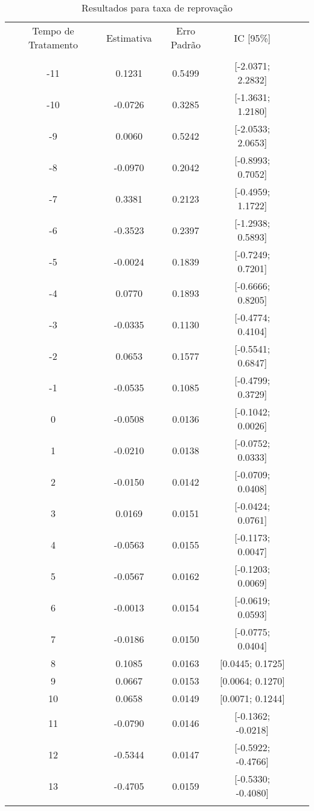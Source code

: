 \documentclass[
        12pt,                           %
        openright,                      %
        oneside,
        a4paper,                        %
        chapter=TITLE,         %
        section=TITLE,         %
        subsection=Title,      %
        english,                        %
        spanish,                        %
        portugues,                      %
        ]{abntex2}
\begin{document}
{\begin{apendicesenv}
\begin{table}[htbp]
\caption{Resultados para taxa de reprovação}
\centering
\begin{tabular}{cccccc}
\\ \hline
Tempo de Tratamento & Estimativa & Erro Padrão & IC [95\%] \\
\\ \hline
-11 & 0.1231 & 0.5499 & [-2.0371; 2.2832] \\
-10 & -0.0726 & 0.3285 & [-1.3631; 1.2180] \\
-9 & 0.0060 & 0.5242 & [-2.0533; 2.0653] \\
-8 & -0.0970 & 0.2042 & [-0.8993; 0.7052] \\
-7 & 0.3381 & 0.2123 & [-0.4959; 1.1722] \\
-6 & -0.3523 & 0.2397 & [-1.2938; 0.5893] \\
-5 & -0.0024 & 0.1839 & [-0.7249; 0.7201] \\
-4 & 0.0770 & 0.1893 & [-0.6666; 0.8205] \\
-3 & -0.0335 & 0.1130 & [-0.4774; 0.4104] \\
-2 & 0.0653 & 0.1577 & [-0.5541; 0.6847] \\
-1 & -0.0535 & 0.1085 & [-0.4799; 0.3729] \\
0 & -0.0508 & 0.0136 & [-0.1042; 0.0026] \\
1 & -0.0210 & 0.0138 & [-0.0752; 0.0333] \\
2 & -0.0150 & 0.0142 & [-0.0709; 0.0408] \\
3 & 0.0169 & 0.0151 & [-0.0424; 0.0761] \\
4 & -0.0563 & 0.0155 & [-0.1173; 0.0047] \\
5 & -0.0567 & 0.0162 & [-0.1203; 0.0069] \\
6 & -0.0013 & 0.0154 & [-0.0619; 0.0593] \\
7 & -0.0186 & 0.0150 & [-0.0775; 0.0404] \\
8 & 0.1085 & 0.0163 & [0.0445; 0.1725] \\
9 & 0.0667 & 0.0153 & [0.0064; 0.1270] \\
10 & 0.0658 & 0.0149 & [0.0071; 0.1244] \\
11 & -0.0790 & 0.0146 & [-0.1362; -0.0218] \\
12 & -0.5344 & 0.0147 & [-0.5922; -0.4766] \\
13 & -0.4705 & 0.0159 & [-0.5330; -0.4080] \\
\\ \hline
\end{tabular}
\label{tab:resultados_reprovacao}
\end{table}



\end{apendicesenv}}
\end{document}
